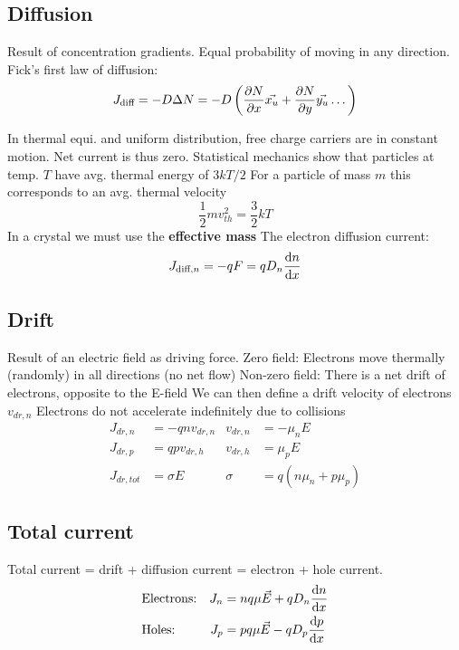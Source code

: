 \documentclass[a4paper, fontsize=8pt, landscape, DIV=1]{scrartcl}
\begin{document}
\begin{multicols*}{4}
  \subsection{Diffusion}
    Result of concentration gradients.
    Equal probability of moving in any direction.
    Fick's first law of diffusion:
    \[J_{\text{diff}} = -D\Delta N = -D \left( \frac{\partial N}{\partial x}\vec{x_u} + \frac{\partial N}{\partial y}\vec{y_u} \dots \right)\]

    In thermal equi. and uniform distribution, free charge carriers are in constant motion. 
    Net current is thus zero.
    Statistical mechanics show that particles at temp. $T$ have avg. thermal energy of $3kT/2$
    For a particle of mass $m$ this corresponds to an avg. thermal velocity
    \[\frac{1}{2}mv_{th}^2=\frac{3}{2}kT\]
    In a crystal we must use the \textbf{effective mass}
    The electron diffusion current:
    \[ J_{\text{diff},n} = -qF = qD_n\frac{\mathrm{d}n}{\mathrm{d}x}\]

  \subsection{Drift}
    Result of an electric field as driving force.
    Zero field: Electrons move thermally (randomly) in all directions (no net flow)
    Non-zero field: There is a net drift of electrons, opposite to the E-field
    We can then define a drift velocity of electrons $v_{dr,n}$
    Electrons do not accelerate indefinitely due to collisions
    \begin{align*}
      J_{dr,n} &= -qnv_{dr,n} & v_{dr,n} &= -\mu_nE \\
      J_{dr,p} &= qpv_{dr,h} & v_{dr,h} &= \mu_pE \\
      J_{dr,tot} &= \sigma E & \sigma &= q(n\mu_n + p\mu_p)
    \end{align*}
  
  \subsection{Total current}
    Total current = drift + diffusion current = electron + hole current.
    \begin{align*}
      &\text{Electrons:} & J_n &= nq\mu\vec{E}+qD_n\frac{\mathrm{d}n}{\mathrm{d}x} \\
      &\text{Holes:} & J_p &= pq\mu\vec{E}-qD_p\frac{\mathrm{d}p}{\mathrm{d}x} \\
    \end{align*}


\end{multicols*}
\end{document}
